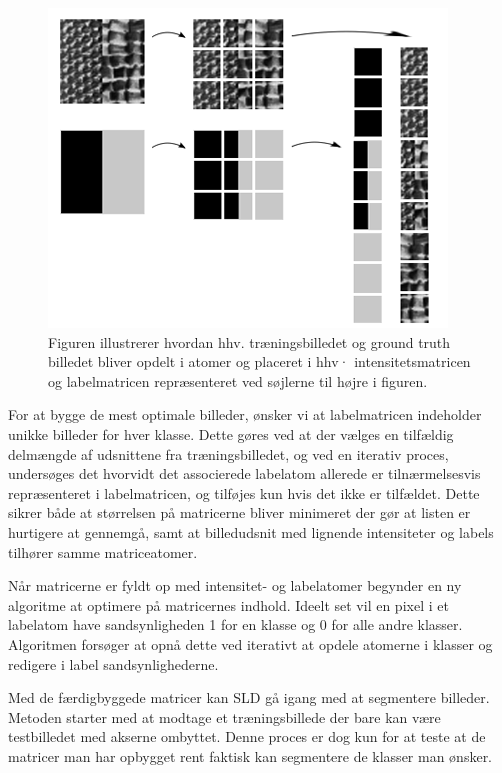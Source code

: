 \begin{figure}[H]
		\includegraphics[scale=1]{files/postmethod/img/dict_new1.png}
	\caption{Figuren illustrerer hvordan hhv. træningsbilledet og ground truth billedet bliver opdelt i atomer og placeret i hhv· intensitetsmatricen og labelmatricen repræsenteret ved søjlerne til højre i figuren. \label{fig:postmethod_intensitydict_init}}
\end{figure}

For at bygge de mest optimale billeder, ønsker vi at labelmatricen indeholder unikke billeder for hver klasse. Dette gøres ved at der vælges en tilfældig delmængde af udsnittene fra træningsbilledet, og ved en iterativ proces, undersøges det hvorvidt det associerede labelatom allerede er tilnærmelsesvis repræsenteret i labelmatricen, og tilføjes kun hvis det ikke er tilfældet. Dette sikrer både at størrelsen på matricerne bliver minimeret der gør at listen er hurtigere at gennemgå, samt at billedudsnit med lignende intensiteter og labels tilhører samme matriceatomer. 

Når matricerne er fyldt op med intensitet- og labelatomer begynder en ny algoritme at optimere på matricernes indhold. Ideelt set vil en pixel i et labelatom have sandsynligheden 1 for en klasse og 0 for alle andre klasser. Algoritmen forsøger at opnå dette ved iterativt at opdele atomerne i klasser og redigere i label sandsynlighederne. 

Med de færdigbyggede matricer kan SLD gå igang med at segmentere billeder. Metoden starter med at modtage et træningsbillede der bare kan være testbilledet med akserne ombyttet. Denne proces er dog kun for at teste at de matricer man har opbygget rent faktisk kan segmentere de klasser man ønsker.

